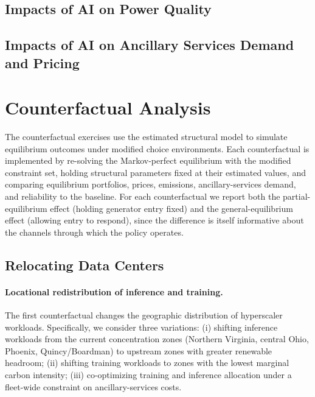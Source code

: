 \documentclass[12pt,letterpaper]{article}
\begin{document}
\subsection{Impacts of AI on Power Quality}


\subsection{Impacts of AI on Ancillary Services Demand and Pricing}


\section{Counterfactual Analysis}
\label{sec:cf}

The counterfactual exercises use the estimated structural model to
simulate equilibrium outcomes under modified choice environments. Each
counterfactual is implemented by re-solving the Markov-perfect equilibrium
with the modified constraint set, holding structural parameters fixed at
their estimated values, and comparing equilibrium portfolios, prices,
emissions, ancillary-services demand, and reliability to the baseline.
For each counterfactual we report both the partial-equilibrium effect
(holding generator entry fixed) and the general-equilibrium effect
(allowing entry to respond), since the difference is itself informative
about the channels through which the policy operates.

\subsection{Relocating Data Centers}

\paragraph{Locational redistribution of inference and training.}
The first counterfactual changes the geographic distribution of
hyperscaler workloads. Specifically, we consider three variations:
(i) shifting inference workloads from the current concentration zones
(Northern Virginia, central Ohio, Phoenix, Quincy/Boardman) to upstream
zones with greater renewable headroom; (ii) shifting training workloads
to zones with the lowest marginal carbon intensity; (iii) co-optimizing
training and inference allocation under a fleet-wide constraint on
ancillary-services costs.
\end{document}
